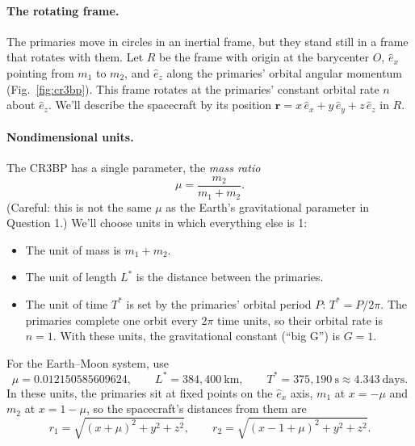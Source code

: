 \documentclass[11pt,letterpaper]{article}
\newcommand{\br}{\mathbf{r}}
\begin{document}
\paragraph{The rotating frame.} The primaries move in circles in an inertial frame, but they stand still in a frame that rotates with them. Let $R$ be the frame with origin at the barycenter $O$, $\hat e_x$ pointing from $m_1$ to $m_2$, and $\hat e_z$ along the primaries' orbital angular momentum (Fig.~\ref{fig:cr3bp}). This frame rotates at the primaries' constant orbital rate $n$ about $\hat e_z$. We'll describe the spacecraft by its position $\br = x\,\hat e_x + y\,\hat e_y + z\,\hat e_z$ in $R$.

\paragraph{Nondimensional units.} The CR3BP has a single parameter, the \emph{mass ratio}
\[
\mu = \frac{m_2}{m_1 + m_2}.
\]
(Careful: this is not the same $\mu$ as the Earth's gravitational parameter in Question 1.) We'll choose units in which everything else is 1:
\begin{itemize}
    \item The unit of mass is $m_1 + m_2$.
    \item The unit of length $L^*$ is the distance between the primaries.
    \item The unit of time $T^*$ is set by the primaries' orbital period $P$: $T^* = P/2\pi$. The primaries complete one orbit every $2\pi$ time units, so their orbital rate is $n = 1$. With these units, the gravitational constant (``big G'') is $G = 1$.
\end{itemize}
For the Earth--Moon system, use
\[
\mu = 0.012150585609624, \qquad L^* = 384{,}400~\text{km}, \qquad T^* = 375{,}190~\text{s} \approx 4.343~\text{days}.
\]
In these units, the primaries sit at fixed points on the $\hat e_x$ axis, $m_1$ at $x = -\mu$ and $m_2$ at $x = 1-\mu$, so the spacecraft's distances from them are
\[
r_1 = \sqrt{(x+\mu)^2 + y^2 + z^2}, \qquad r_2 = \sqrt{(x-1+\mu)^2 + y^2 + z^2}.
\]
\end{document}
